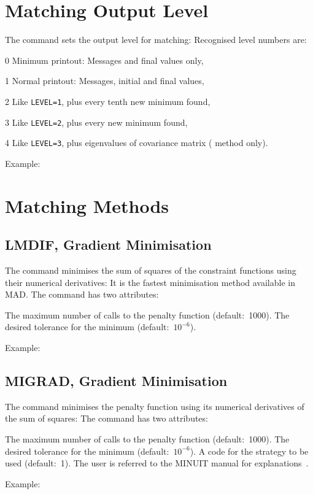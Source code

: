 \section{Matching Output Level}
\label{S-LEVCMD}
The  command sets the output level for matching:
Recognised level numbers are:
\begin{mylist}
\item[0]
Minimum printout: Messages and final values only,
\item[1]
Normal printout: Messages, initial and final values,
\item[2]
Like {\tt LEVEL=1}, plus every tenth new minimum found,
\item[3]
Like {\tt LEVEL=2}, plus every new minimum found,
\item[4]
Like {\tt LEVEL=3}, plus eigenvalues of covariance matrix
( method only).
\end{mylist}
Example:
 
\section{Matching Methods}
\label{S-MATMET}
 
\subsection{LMDIF, Gradient Minimisation}
The  command minimises the sum of squares of the constraint
functions using their numerical derivatives:
It is the fastest minimisation method available in MAD.
The command has two attributes:
\begin{mylist}
The maximum number of calls to the penalty function (default:~1000).
The desired tolerance for the minimum (default:~\(10^{-6}\)).
\end{mylist}
Example:
 
\subsection{MIGRAD, Gradient Minimisation}
The  command minimises the penalty
function using its numerical derivatives of the sum of squares:
The command has two attributes:
\begin{mylist}
The maximum number of calls to the penalty function (default:~1000).
The desired tolerance for the minimum (default:~\(10^{-6}\)).
A code for the strategy to be used (default:~1).
The user is referred to the MINUIT manual for explanations~\cite{B-JAM71}.
\end{mylist}
Example:
 
